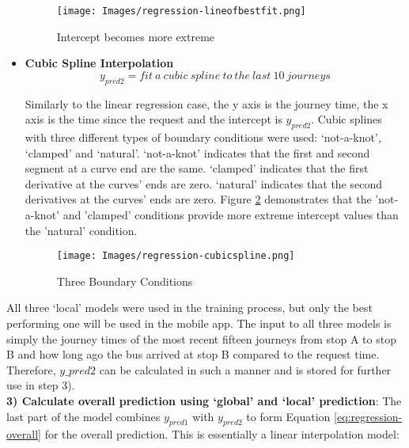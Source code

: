 \begin{itemize}
    \begin{figure}[H]
    \begin{center}
        \texttt{[image: Images/regression-lineofbestfit.png]}
        \caption{Intercept becomes more extreme}
        \label{fig:extreme-bestfit}
    \end{center}
    \end{figure}
    
    \item \textbf{Cubic Spline Interpolation}
    \begin{equation}
        y_{pred2} = fit\ a\ cubic\ spline\ to\ the\ last\ 10\ journeys
    \end{equation}
    
    Similarly to the linear regression case, the y axis is the journey time, the x axis is the time since the request and the intercept is $y_{pred2}$. Cubic splines with three different types of boundary conditions were used: `not-a-knot', `clamped' and `natural'. `not-a-knot' indicates that the first and second segment at a curve end are the same. `clamped' indicates that the first derivative at the curves' ends are zero. `natural' indicates that the second derivatives at the curves' ends are zero. Figure \ref{fig:three-bounary-conditions} demonstrates that the 'not-a-knot' and 'clamped' conditions provide more extreme intercept values than the 'natural' condition.
    
    \begin{figure}[H]
    \begin{center}
        \texttt{[image: Images/regression-cubicspline.png]}
        \caption{Three Boundary Conditions}
        \label{fig:three-bounary-conditions}
    \end{center}
    \end{figure}

\end{itemize}

All three `local' models were used in the training process, but only the best performing one will be used in the mobile app. The input to all three models is simply the journey times of the most recent fifteen journeys from stop A to stop B and how long ago the bus arrived at stop B compared to the request time. Therefore, $y\_{pred2}$ can be calculated in such a manner and is stored for further use in step 3).\\

\textbf{3) Calculate overall prediction using `global' and `local' prediction}: The last part of the model combines $y_{pred1}$ with $y_{pred2}$ to form Equation \ref{eq:regression-overall} for the overall prediction. This is essentially a linear interpolation model:

